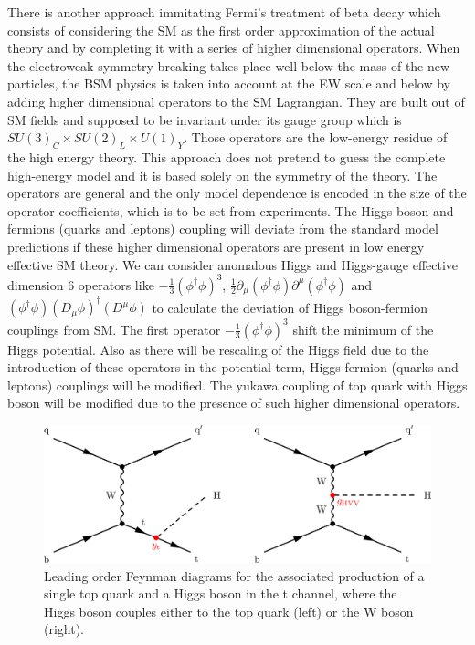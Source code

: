 \documentclass[final,3p]{CSP}
\begin{document}
There is another approach immitating 
Fermi's treatment of beta decay 
which consists of considering the SM as the first order approximation of the actual theory 
and by completing it with a series 
of higher dimensional operators. When the electroweak symmetry breaking takes place well 
below the mass of the new particles, 
the BSM physics is taken into account at the EW scale and below by adding higher dimensional 
operators to the SM Lagrangian. 
They are built out of SM fields and supposed to be invariant under its gauge group which is $SU(3)_C \times SU(2)_L \times U(1)_Y$. Those 
operators are the low-energy residue 
of the high energy theory. This approach does not pretend to guess the complete high-energy 
model and it is based solely on 
the symmetry of the  theory. The operators are general and the only model dependence is 
encoded in the size of the operator
coefficients, which is to be set from experiments. The Higgs boson and fermions (quarks and leptons) coupling will deviate from the standard 
model predictions if these higher 
dimensional operators are present in low energy effective SM theory. We can consider 
anomalous Higgs and Higgs-gauge effective 
dimension 6 operators like $-\frac{1}{3}(\phi^{\dagger}\phi)^3$, $\frac{1}{2} \partial_{\mu} 
(\phi^{\dagger} \phi) 
\partial^{\mu}(\phi^{\dagger} \phi)$ and $(\phi^{\dagger} \phi)(D_{\mu} \phi)^{\dagger} 
(D^{\mu} \phi)$ to calculate the 
deviation of Higgs boson-fermion couplings from SM. The first operator $-\frac{1}{3}(\phi^{\dagger}\phi)^3$ shift the minimum of 
the Higgs potential. Also as there 
will be rescaling of the Higgs field due to the introduction of these operators in the 
potential term, Higgs-fermion (quarks 
and leptons) couplings will be modified. The yukawa coupling of top quark with Higgs boson will be modified due to the presence of such higher dimensional operators.

\begin{figure}[ht]
	\centering
	\includegraphics[width=\columnwidth]{./cms.png}
	\caption{Leading order Feynman diagrams for the associated production of a single top quark and a Higgs boson in the t channel, where the Higgs boson couples either to the top quark (left) or the W boson (right).}
	\label{figure 4}
\end{figure}
\end{document}
